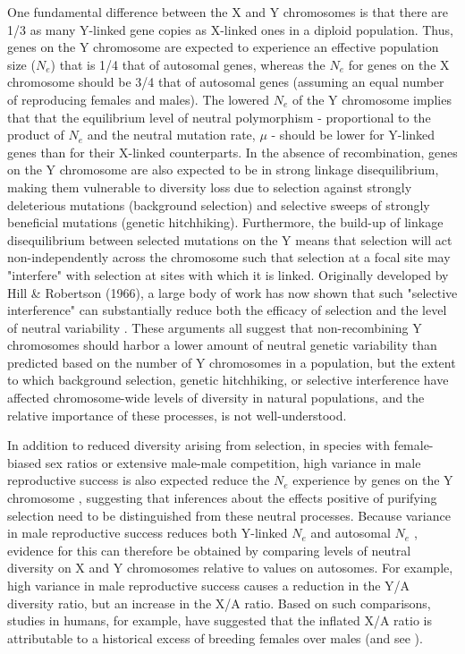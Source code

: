 \documentclass[9pt,twocolumn,twoside]{gsajnl}
\begin{document}
One fundamental difference between the X and Y chromosomes is that there are 1/3 as many Y-linked gene copies as X-linked ones in a diploid population. Thus, genes on the Y chromosome are expected to experience an effective population size ($N_{e}$) that is 1/4 that of autosomal genes, whereas the  $N_{e}$ for genes on the X chromosome should be 3/4 that of autosomal genes (assuming an equal number of reproducing females and males). The lowered $N_{e}$ of the Y chromosome implies that that the equilibrium level of neutral polymorphism - proportional to the product of $N_{e}$ and the neutral mutation rate, $\mu$ - should be lower for Y-linked genes than for their X-linked counterparts. In the absence of recombination, genes on the Y chromosome are also expected to be in strong linkage disequilibrium, making them vulnerable to diversity loss due to selection against strongly deleterious mutations (background selection) and selective sweeps of strongly beneficial mutations (genetic hitchhiking). Furthermore, the build-up of linkage disequilibrium between selected mutations on the Y means that selection will act non-independently across the chromosome such that selection at a focal site may "interfere" with selection at sites with which it is linked. Originally developed by Hill & Robertson (1966), a large body of work has now shown that such "selective interference" can substantially reduce both the efficacy of selection and the level of neutral variability \citep{fisher1930genetical, muller1964relation, hill1966HReffect, mcvean2000}. These arguments all suggest that non-recombining Y chromosomes should harbor a lower amount of neutral genetic variability than predicted based on the number of Y chromosomes in a population, but the extent to which background selection, genetic hitchhiking, or selective interference have affected chromosome-wide levels of diversity in natural populations, and the relative importance of these processes, is not well-understood.

In addition to reduced diversity arising from selection, in species with female-biased sex ratios or extensive male-male competition, high variance in male reproductive success is also expected reduce the $N_{e}$ experience by genes on the Y chromosome \citep{caballero1995,charlesworth2001,laporte2002,pool2007,ellegren2009}, suggesting that inferences about the effects positive of purifying selection need to be distinguished from these neutral processes. Because variance in male reproductive success reduces both Y-linked $N_{e}$ and autosomal $N_{e}$ \citep{kimura1964number,nomura2002effective}, evidence for this can therefore be obtained by comparing levels of neutral diversity on X and Y chromosomes relative to values on autosomes. For example, high variance in male reproductive success causes a reduction in the Y/A diversity ratio, but an increase in the X/A ratio. Based on such comparisons, studies in humans, for example, have suggested that the inflated X/A ratio is attributable to a historical excess of breeding females over males \citep{hammer2008sex} (and see \citep{bustamante2009,hammer2010,cotter2016genetic}).
\end{document}

